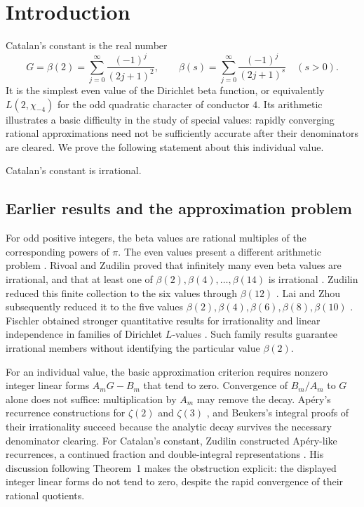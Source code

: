 \section{Introduction}\label{sec:introduction}

Catalan's constant is the real number
\[
G=\beta(2)=\sum_{j=0}^{\infty}\frac{(-1)^j}{(2j+1)^2},
\qquad
\beta(s)=\sum_{j=0}^{\infty}\frac{(-1)^j}{(2j+1)^s}\quad(s>0).
\]
It is the simplest even value of the Dirichlet beta function, or
equivalently $L(2,\chi_{-4})$ for the odd quadratic character of
conductor $4$. Its arithmetic illustrates a basic difficulty in the
study of special values: rapidly converging rational approximations
need not be sufficiently accurate after their denominators are cleared.
We prove the following statement about this individual value.

\begin{theorem}\label{thm:main}
Catalan's constant is irrational.
\end{theorem}

\subsection{Earlier results and the approximation problem}

For odd positive integers, the beta values are rational multiples of the
corresponding powers of $\pi$. The even values present a different
arithmetic problem \cite[Introduction]{RivoalZudilin2003}.
Rivoal and Zudilin proved that infinitely many even beta values are
irrational, and that at least one of
$\beta(2),\beta(4),\ldots,\beta(14)$ is irrational
\cite[Theorems~1 and~2]{RivoalZudilin2003}.
Zudilin reduced this finite collection to the six values through
$\beta(12)$ \cite[Theorem~1]{Zudilin2019}.
Lai and Zhou subsequently reduced it to the five values
$\beta(2),\beta(4),\beta(6),\beta(8),\beta(10)$
\cite[Theorem~6.1]{LaiZhou2022}.
Fischler obtained stronger quantitative results for irrationality and
linear independence in families of Dirichlet $L$-values
\cite[Theorems~1 and~2]{Fischler2020}.
Such family results guarantee irrational members without identifying
the particular value $\beta(2)$.

For an individual value, the basic approximation criterion requires
nonzero integer linear forms $A_mG-B_m$ that tend to zero.
Convergence of $B_m/A_m$ to $G$ alone does not suffice: multiplication
by $A_m$ may remove the decay.
Ap\'ery's recurrence constructions for $\zeta(2)$ and $\zeta(3)$
\cite{Apery1979}, and Beukers's integral proofs of their irrationality
\cite{Beukers1979} succeed because the analytic decay survives the
necessary denominator clearing.
For Catalan's constant, Zudilin constructed Ap\'ery-like recurrences,
a continued fraction and double-integral representations
\cite[Theorems~1--3]{Zudilin2003}.
His discussion following Theorem~1 makes the obstruction explicit:
the displayed integer linear forms do not tend to zero, despite the
rapid convergence of their rational quotients.

